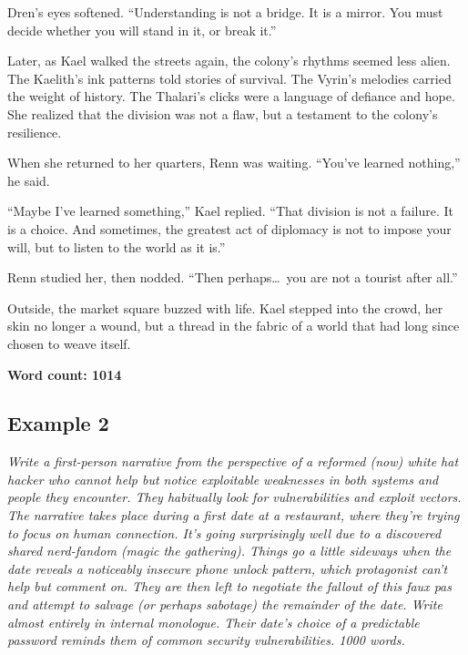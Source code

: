 \documentclass{article}
\theoremstyle{plain}
\theoremstyle{definition}
\theoremstyle{remark}
\begin{document}
\begin{tcolorbox}[colback=green!3, colframe=green!40!black, title=\textbf{RcRL (Ours)}, fonttitle=\bfseries, left=2mm, right=2mm, breakable]
Dren’s eyes softened. ``Understanding is not a bridge. It is a mirror. You must decide whether you will stand in it, or break it.''

Later, as Kael walked the streets again, the colony’s rhythms seemed less alien. The Kaelith’s ink patterns told stories of survival. The Vyrin’s melodies carried the weight of history. The Thalari’s clicks were a language of defiance and hope. She realized that the division was not a flaw, but a testament to the colony’s resilience.

When she returned to her quarters, Renn was waiting. ``You’ve learned nothing,'' he said.

``Maybe I’ve learned something,'' Kael replied. ``That division is not a failure. It is a choice. And sometimes, the greatest act of diplomacy is not to impose your will, but to listen to the world as it is.''

Renn studied her, then nodded. ``Then perhaps\dots\ you are not a tourist after all.''

Outside, the market square buzzed with life. Kael stepped into the crowd, her skin no longer a wound, but a thread in the fabric of a world that had long since chosen to weave itself.
\vspace{0.5em}

\textbf{Word count: 1014}
\end{tcolorbox}
\subsection{Example 2}

\begin{tcolorbox}[colback=blue!3, colframe=blue!50!black, title=\textbf{Prompt}, fonttitle=\bfseries]
\textit{Write a first-person narrative from the perspective of a reformed (now) white hat hacker who cannot help but notice exploitable weaknesses in both systems and people they encounter. They habitually look for vulnerabilities and exploit vectors. The narrative takes place during a first date at a restaurant, where they're trying to focus on human connection. It's going surprisingly well due to a discovered shared nerd-fandom (magic the gathering). Things go a little sideways when the date reveals a noticeably insecure phone unlock pattern, which protagonist can't help but comment on. They are then left to negotiate the fallout of this faux pas and attempt to salvage (or perhaps sabotage) the remainder of the date. Write almost entirely in internal monologue. Their date's choice of a predictable password reminds them of common security vulnerabilities. 1000 words.}
\end{tcolorbox}
\end{document}
